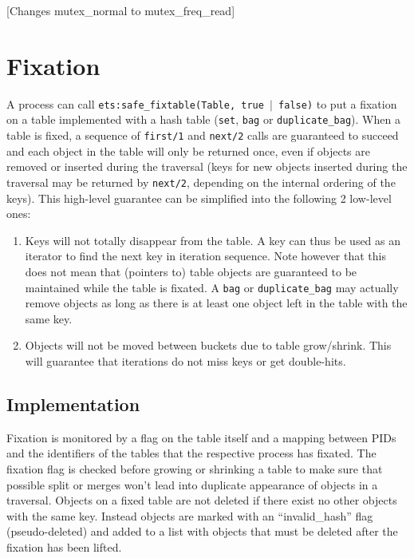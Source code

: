 \documentclass[aps,pre,preprint,nofootinbib]{revtex4}
\begin{document}
[Changes mutex\_normal to mutex\_freq\_read]

\section{Fixation}
\label{sec:fixation}

A process can call \texttt{ets:safe\_fixtable(Table, true $|$ false)} to put a fixation on a table implemented with a hash table (\verb|set|, \verb|bag| or \verb|duplicate_bag|).
When a table is fixed, a sequence of \verb|first/1| and \verb|next/2| calls are guaranteed to succeed and each object in the table will only be returned once, even if objects are removed or inserted during the traversal (keys for new objects inserted during the traversal may be returned by \verb|next/2|, depending on the internal ordering of the keys).
This high-level guarantee can be simplified into the following 2 low-level ones:

\begin{enumerate}
\item Keys will not totally disappear from the table.
  A key can thus be used as an iterator to find the next key in iteration sequence.
  Note however that this does not mean that (pointers to) table objects are guaranteed to be maintained while the table is fixated.
  A \verb|bag| or \verb|duplicate_bag| may actually remove objects as long as there is at least one object left in the table with the same key.
\item Objects will not be moved between buckets due to table grow/shrink.
  This will guarantee that iterations do not miss keys or get double-hits.
\end{enumerate}

\subsection{Implementation}

Fixation is monitored by a flag on the table itself and a mapping between PIDs and the identifiers of the tables that the respective process has fixated.
The fixation flag is checked before growing or shrinking a table to make sure that possible split or merges won't lead into duplicate appearance of objects in a traversal.
Objects on a fixed table are not deleted if there exist no other objects with the same key.
Instead objects are marked with an ``invalid\_hash'' flag (pseudo-deleted) and added to a list with objects that must be deleted after the fixation has been lifted.
\end{document}
